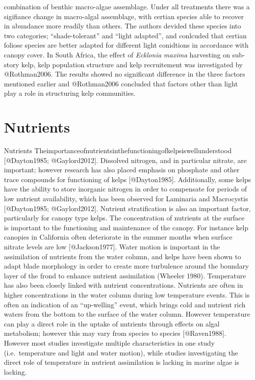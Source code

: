 \documentclass[]{article}
\begin{document}
combination of benthic macro-algae assemblage. Under all treatments
there was a sigiﬁance change in macro-algal assemblage, with certian
species able to recover in abundance more readily than others. The
authors devided these species into two categories; ``shade-tolerant''
and ``light adapted'', and conlcuded that certian foliose species are
better adapted for diﬀerent light conidtions in accordance with canopy
cover. In South Africa, the eﬀect of \emph{Ecklonia maxima} harvesting
on sub-story kelp, kelp population structure and kelp recruitement was
investigated by @Rothman2006. The results showed no signiﬁcant diﬀerence
in the three factors mentioned earlier and @Rothman2006 concluded that
factors other than light play a role in structuring kelp communities.

\section{Nutrients}\label{nutrients}

Nutrients
Theimportanceofnutrientsinthefunctioningofkelpsiswellunderstood
{[}@Dayton1985; @Gaylord2012{]}. Dissolved nitrogen, and in particular
nitrate, are important; however research has also placed emphasis on
phosphate and other trace compounds for functioning of kelps
{[}@Dayton1985{]}. Additionally, some kelps have the ability to store
inorganic nitrogen in order to compensate for periods of low nutrient
availability, which has been observed for Laminaria and Macrocystis
{[}@Dayton1985; @Gaylord2012{]}. Nutrient stratiﬁcation is also an
important factor, particularly for canopy type kelps. The concentration
of nutrients at the surface is important to the functioning and
maintenance of the canopy. For instance kelp canopies in California
often deteriorate in the summer months when surface nitrate levels are
low {[}@Jackson1977{]}. Water motion is important in the assimilation of
nutrients from the water column, and kelps have been shown to adapt
blade morphology in order to create more turbulence around the boundary
layer of the frond to enhance nutrient assimilation (Wheeler 1980).
Temperature has also been closely linked with nutrient concentrations.
Nutrients are often in higher concentrations in the water column during
low temperature events. This is often an indication of an ``up-welling''
event, which brings cold and nutrient rich waters from the bottom to the
surface of the water column. However temperature can play a direct role
in the uptake of nutrients through eﬀects on algal metabolism; however
this may vary from species to species {[}@Raven1988{]}. However most
studies investigate multiple characteristics in one study
(i.e.~temperature and light and water motion), while studies
investigating the direct role of temperature in nutrient assimilation is
lacking in marine algae is lacking.
\end{document}
